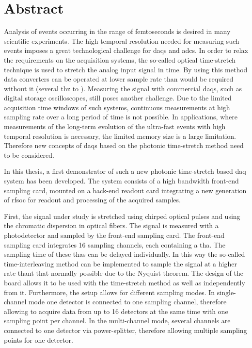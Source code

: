 \chapter*{Abstract}

Analysis of events occurring in the range of femtoseconds is desired in many scientific experiments.
The high temporal resolution needed for measuring such events imposes a great technological challenge for \glspl{daq} and \glspl{adc}.
In order to relax the requirements on the acquisition systems, the so-called optical time-stretch technique is used to stretch the analog input signal in time.
By using this method data converters can be operated at lower sample rate than would be required without it (several \gls{thz} to ). 
Measuring the signal with commercial \glspl{daq}, such as digital storage oscilloscopes, still poses another challenge.
Due to the limited acquisition time windows of such systems, continuous measurements at high sampling rate over a long period of time is not possible.
In applications, where measurements of the long-term evolution of the ultra-fast events with high temporal resolution is necessary, the limited memory size is a large limitation.
Therefore new concepts of \glspl{daq} based on the photonic time-stretch method need to be considered.

In this thesis, a first demonstrator of such a new photonic time-stretch based \gls{daq} system has been developed.
The system consists of a high bandwidth front-end sampling card, mounted on a back-end readout card integrating a new generation of \gls{rfsoc} for readout and processing of the acquired samples. 

First, the signal under study is stretched using chirped optical pulses and using the chromatic dispersion in optical fibers.
The signal is measured with a photodetector and sampled by the front-end sampling card.
The front-end sampling card integrates 16 sampling channels, each containing a \gls{tha}. 
The sampling time of these \glspl{tha} can be delayed individually.
In this way the so-called time-interleaving method can be implemented to sample the signal at a higher rate thant that normally possible due to the Nyquist theorem.
The design of the board allows it to be used with the time-stretch method as well as independently from it.
Furthermore, the setup allows for different sampling modes.
In single-channel mode one detector is connected to one sampling channel, therefore allowing to acquire data from up to 16 detectors at the same time with one sampling point per channel.
In the multi-channel mode, several channels are connected to one detector via power-splitter, therefore allowing multiple sampling points for one detector. %

